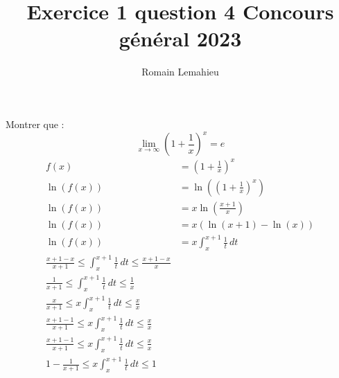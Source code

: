 \documentclass{exam}
\title{Exercice 1 question 4 Concours général 2023}
\author{Romain Lemahieu}
\begin{document}
\maketitle
Montrer que :
$$
\lim_{x \to \infty} \left(1+\frac{1}{x}\right)^x=e
$$
\begin{align*}
f(x)&=\left(1+\frac{1}{x}\right)^x
\\
\ln(f(x))&=\ln\left(\left(1+\frac{1}{x}\right)^x\right)
\\
\ln(f(x))&=x\ln\left(\frac{x+1}{x}\right)
\\
\ln(f(x))&=x(\ln(x+1)-\ln(x))
\\
\ln(f(x))&=x\int_{x}^{x+1}\frac{1}{t}\,dt
\\
\frac{x+1-x}{x+1}
\le
\int_{x}^{x+1}\frac{1}{t}\,dt
\le
\frac{x+1-x}{x}
\\
\frac{1}{x+1}
\le
\int_{x}^{x+1}\frac{1}{t}\,dt
\le
\frac{1}{x}
\\
\frac{x}{x+1}
\le
x\int_{x}^{x+1}\frac{1}{t}\,dt
\le
\frac{x}{x}
\\
\frac{x+1-1}{x+1}
\le
x\int_{x}^{x+1}\frac{1}{t}\,dt
\le
\frac{x}{x}
\\
\frac{x+1-1}{x+1}
\le
x\int_{x}^{x+1}\frac{1}{t}\,dt
\le
\frac{x}{x}
\\
1-\frac{1}{x+1}
\le
x\int_{x}^{x+1}\frac{1}{t}\,dt
\le
1
\end{align*}
\end{document}
